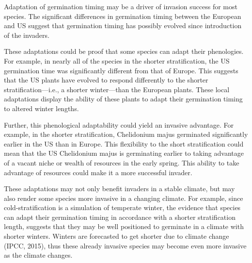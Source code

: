 \documentclass[12pt]{article}\usepackage[]{graphicx}\usepackage[]{color}
\begin{document}
	Adaptation of germination timing may be a driver of invasion success for most species. The significant differences in germination timing between the European and US suggest that germination timing has possibly evolved since introduction of the invaders.  
	
	These adaptations could be proof that some species can adapt their phenologies. For example, in nearly all of the species in the shorter stratification, the US germination time was significantly different from that of Europe. This suggests that the US plants have evolved to respond differently to the shorter stratification—i.e., a shorter winter—than the European plants. These local adaptations display the ability of these plants to adapt their germination timing to altered winter lengths. 
	
	Further, this phenological adaptability could yield an invasive advantage. For example, in the shorter stratification, Chelidonium majus germinated significantly earlier in the US than in Europe. This flexibility to the short stratification could mean that the US Chelidonium majus is germinating earlier to taking advantage of a vacant niche or wealth of resources in the early spring. This ability to take advantage of resources could make it a more successful invader. 
	
	These adaptations may not only benefit invaders in a stable climate, but may also render some species more invasive in a changing climate.  For example, since cold-stratification is a simulation of temperate winter, the evidence that species can adapt their germination timing in accordance with a shorter stratification length, suggests that they may be well positioned to germinate in a climate with shorter winters. Winters are forecasted to get shorter due to climate change (IPCC, 2015), thus these already invasive species may become even more invasive as the climate changes. 
	
\end{document}
